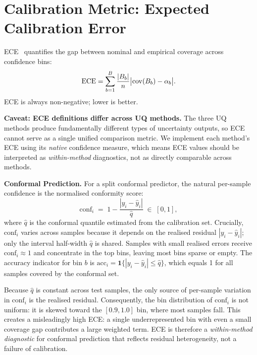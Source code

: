 \documentclass[12pt,a4paper]{article}
\theoremstyle{plain}
\begin{document}
\section{Calibration Metric: Expected Calibration Error}
\label{sec:ece_def}

ECE~\citep{guo2017calibration} quantifies the gap between nominal and empirical
coverage across confidence bins:
\begin{equation}
    {\rm ECE} = \sum_{b=1}^B \frac{|B_b|}{n}\big|{\rm cov}(B_b) - \alpha_b\big|.
    \label{eq:ece}
\end{equation}
ECE is always non-negative; lower is better.

\textbf{Caveat: ECE definitions differ across UQ methods.}
The three UQ methods produce fundamentally different types of uncertainty
outputs, so ECE cannot serve as a single unified comparison metric.
We implement each method's ECE using its \emph{native} confidence measure,
which means ECE values should be interpreted as \emph{within-method}
diagnostics, not as directly comparable across methods.

\textbf{Conformal Prediction.}
For a split conformal predictor, the natural per-sample confidence is the
normalised conformity score:
\begin{equation}
    \label{eq:conf_conformal}
    \text{conf}_i \;=\; 1 - \frac{|y_i - \hat{y}_i|}{\hat{q}}
    \;\in\; [0, 1],
\end{equation}
where $\hat{q}$ is the conformal quantile estimated from the calibration set.
Crucially, $\text{conf}_i$ varies across samples because it depends on the
realised residual $|y_i - \hat{y}_i|$; only the interval half-width $\hat{q}$
is shared.  Samples with small realised errors receive $\text{conf}_i \approx 1$
and concentrate in the top bins, leaving most bins sparse or empty.
The accuracy indicator for bin $b$ is
$\text{acc}_i = \mathbf{1}\{|y_i - \hat{y}_i| \leq \hat{q}\}$,
which equals 1 for all samples covered by the conformal set.

Because $\hat{q}$ is constant across test samples, the only source of
per-sample variation in $\text{conf}_i$ is the realised residual.
Consequently, the bin distribution of $\text{conf}_i$ is not uniform:
it is skewed toward the $[0.9, 1.0]$ bin, where most samples fall.
This creates a misleadingly high ECE: a single underrepresented bin with
even a small coverage gap contributes a large weighted term.
ECE is therefore a \emph{within-method diagnostic} for conformal prediction
that reflects residual heterogeneity, not a failure of calibration.
\end{document}
